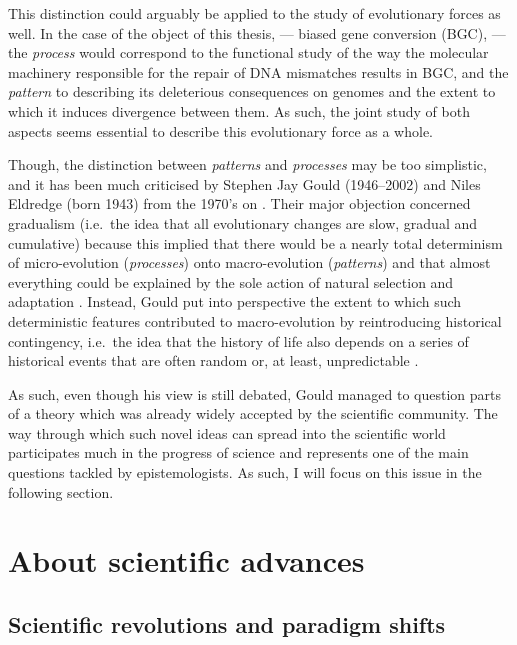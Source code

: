 This distinction could arguably be applied to the study of evolutionary forces as well.
In the case of the object of this thesis, — biased gene conversion (BGC), — the \textit{process} would correspond to the functional study of the way the molecular machinery responsible for the repair of DNA mismatches results in BGC, and the \textit{pattern} to describing its deleterious consequences on genomes and the extent to which it induces divergence between them.
As such, the joint study of both aspects seems essential to describe this evolutionary force as a whole.

Though, the distinction between \textit{patterns} and \textit{processes} may be too simplistic, and it has been much criticised by Stephen Jay Gould (1946--2002) and Niles Eldredge (born 1943) from the 1970's on \citep[reviewed in][]{dericqles2009quelques}.
Their major objection concerned gradualism (i.e.\ the idea that all evolutionary changes are slow, gradual and cumulative) because this implied that there would be a nearly total determinism of micro-evolution (\textit{processes}) onto macro-evolution (\textit{patterns}) and that almost everything could be explained by the sole action of natural selection and adaptation \citep[reviewed in][]{paulin2015epistemologie}.
Instead, Gould put into perspective the extent to which such deterministic features contributed to macro-evolution by reintroducing historical contingency, i.e.\ the idea that the history of life also depends on a series of historical events that are often random or, at least, unpredictable \citep{gould1989wonderful}.

As such, even though his view is still debated, Gould managed to question parts of a theory which was already widely accepted by the scientific community.
The way through which such novel ideas can spread into the scientific world participates much in the progress of science and represents one of the main questions tackled by epistemologists. 
As such, I will focus on this issue in the following section.







\section{About scientific advances}
\subsection{Scientific revolutions and paradigm shifts} 


